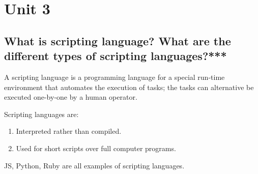\chapter{Unit 3}
\section{What is scripting language? What are the different types of scripting languages?***}
A scripting language is a programming language for a special run-time environment that automates the execution of tasks; the tasks can alternative be executed one-by-one by a human operator. 

Scripting languages are:
\begin{enumerate}
  \item Interpreted rather than compiled.
  \item Used for short scripts over full computer programs.
\end{enumerate}
JS, Python, Ruby are all examples of scripting languages.

